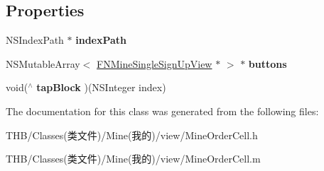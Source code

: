 \subsection*{Properties}
\begin{DoxyCompactItemize}
\item 
\mbox{\label{interface_mine_order_cell_a52ab5044031622bc430b35447cc609c0}} 
N\+S\+Index\+Path $\ast$ {\bfseries index\+Path}
\item 
\mbox{\label{interface_mine_order_cell_a38e88f9025addf01c413439463e483db}} 
N\+S\+Mutable\+Array$<$ \mbox{\hyperlink{interface_f_n_mine_single_sign_up_view}{F\+N\+Mine\+Single\+Sign\+Up\+View}} $\ast$ $>$ $\ast$ {\bfseries buttons}
\item 
\mbox{\label{interface_mine_order_cell_a80bef675d54b15bdce83aeb85f645d78}} 
void($^\wedge$ {\bfseries tap\+Block} )(N\+S\+Integer index)
\end{DoxyCompactItemize}


The documentation for this class was generated from the following files\+:\begin{DoxyCompactItemize}
\item 
T\+H\+B/\+Classes(类文件)/\+Mine(我的)/view/Mine\+Order\+Cell.\+h\item 
T\+H\+B/\+Classes(类文件)/\+Mine(我的)/view/Mine\+Order\+Cell.\+m\end{DoxyCompactItemize}
